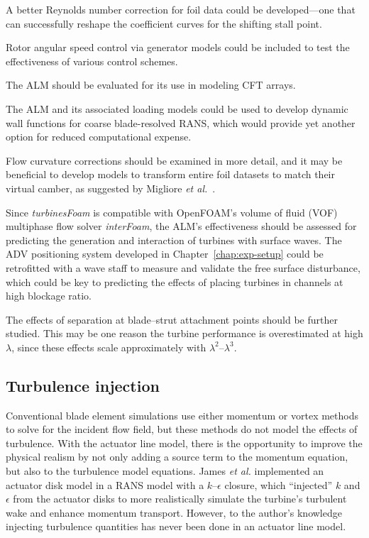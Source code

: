 A better Reynolds number correction for foil data could be developed---one that
can successfully reshape the coefficient curves for the shifting stall point.

Rotor angular speed control via generator models could be included to test the
effectiveness of various control schemes.

The ALM should be evaluated for its use in modeling CFT arrays.

The ALM and its associated loading models could be used to develop dynamic wall
functions for coarse blade-resolved RANS, which would provide yet another option
for reduced computational expense.

Flow curvature corrections should be examined in more detail, and it may be
beneficial to develop models to transform entire foil datasets to match their
virtual camber, as suggested by Migliore \emph{et al.}~\cite{Migliore1980}.

Since \textit{turbinesFoam} is compatible with OpenFOAM's volume of fluid (VOF)
multiphase flow solver \textit{interFoam}, the ALM's effectiveness should be
assessed for predicting the generation and interaction of turbines with surface
waves. The ADV positioning system developed in Chapter~\ref{chap:exp-setup}
could be retrofitted with a wave staff to measure and validate the free surface
disturbance, which could be key to predicting the effects of placing turbines in
channels at high blockage ratio.

The effects of separation at blade--strut attachment points should be further
studied. This may be one reason the turbine performance is overestimated at high
$\lambda$, since these effects scale approximately with
$\lambda^2$--$\lambda^3$.


\subsection{Turbulence injection}

Conventional blade element simulations use either momentum or vortex methods to
solve for the incident flow field, but these methods do not model the effects of
turbulence. With the actuator line model, there is the opportunity to improve
the physical realism by not only adding a source term to the momentum equation,
but also to the turbulence model equations. James \emph{et al.} \cite{James2010}
implemented an actuator disk model in a RANS model with a $k$--$\epsilon$
closure, which ``injected'' $k$ and $\epsilon$ from the actuator disks to more
realistically simulate the turbine's turbulent wake and enhance momentum
transport. However, to the author's knowledge injecting turbulence quantities
has never been done in an actuator line model.

